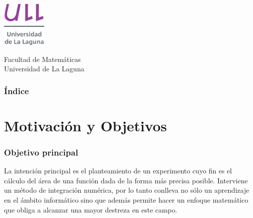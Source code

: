 \documentclass{beamer}
\title[Método de Simpson]{\fbox{\fbox{Método de Simpson}}}
\author[Melanie, Nadia, Tania]{Melanie Hernández, Nadia Chinea, Tania Gutiérrez}
\date[17-05-2013]{17 de mayo de 2013}
\begin{document}
  
\begin{frame}

 \hspace*{7.5cm}
 \includegraphics[width=0.16\textwidth]{logotipo-secundario-ULL.eps}
  \titlepage

  \begin{scriptsize}
    \begin{center}
     Facultad de Matemáticas \\
     Universidad de La Laguna
    \end{center}
  \end{scriptsize}

\end{frame}

\begin{frame}
  \frametitle{Índice}  
  \tableofcontents[pausesections]
\end{frame}




\section{Motivación y Objetivos}


\begin{frame}

\frametitle{Objetivo principal}
 
\begin{block}{}
La intención principal es el planteamiento de un experimento cuyo fin 
es el cálculo del área de una función dada de la forma más precisa posible. 
Interviene un método de integración numérica, por lo tanto conlleva no sólo un aprendizaje en el ámbito informático 
sino que además permite hacer un enfoque matemático 
que obliga a alcanzar una mayor destreza en este campo.

\end{block}
\end{frame}
\end{document}
